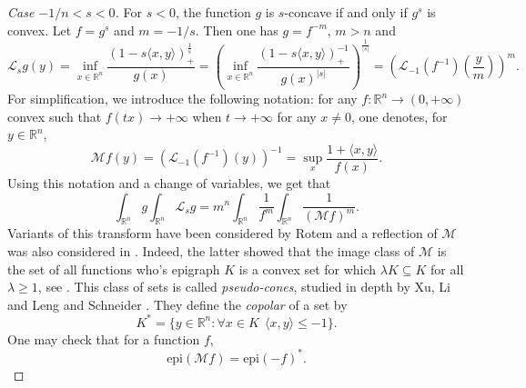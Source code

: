 \documentclass[10pt]{amsart}
\theoremstyle{definition}
\theoremstyle{remark}
\newcommand{\R}{\mathbb{R}}
\renewcommand{\L}{\mathcal{L}}
\newcommand{\M}{\mathcal{M}}
\begin{document}
\begin{proof}[Case $-1/n<s< 0$]
For $s<0$, the function $g$ is $s$-concave if and only if $g^s$ is convex. Let $f=g^s$ and $m=-1/s$. Then one has $g=f^{-m}$, $m>n$ and 
\[
\L_s g(y)=\inf_{x\in\R^n}\frac{\left(1-s\langle x,y\rangle\right)_+^\frac{1}{s}}{g(x)}
=\left(\inf_{x\in\R^n}\frac{(1-s\langle x,y\rangle)_+^{-1}}{g(x)^{|s|}}\right)^\frac{1}{|s|}
=\left(\L_{-1}(f^{-1})\left(\frac{y}{m}\right)\right)^{m}.
\]
For simplification, we introduce the following notation: for any $f:\R^n\to(0,+\infty)$ convex 
such that $f(tx)\to+\infty$ when $t\to+\infty$ for any $x\neq0$, one denotes, for $y\in\R^n$,
\[
\M f(y)=(\L_{-1}(f^{-1})(y))^{-1}=\sup_x\frac{1+\langle x,y\rangle}{f(x)}.
\]
Using this notation and a change of variables, we get that 
\begin{equation}\label{eq:Ps-when-negative}
 \int_{\R^n} g\int_{\R^n}\L_s g=m^n\int_{\R^n} \frac{1}{f^m}\int_{\R^n} \frac{1}{(\M f)^{m}}.
\end{equation}
 Variants of this transform have been considered by Rotem \cite{Rot14} and a reflection of $\M$ was also considered in \cite{AASW23}.
Indeed, the latter showed that the image class of $\M$ is the set of all functions who's epigraph $K$ is a convex set for which $\lambda K \subseteq K$ for all $\lambda \ge 1$, see \cite[Section 3]{AASW23}. This class of sets is called \emph{pseudo-cones}, studied in depth by Xu, Li and Leng \cite{XLL23} and Schneider \cite{sch23}. They define the \emph{copolar} of a set by
\[K^* = \{y\in \R^n:  \forall x \in K \ \  \langle x,y\rangle \le -1\}.\]
One may check that for a function $f$,
\[\text{epi}(\M f) = \text{epi}(-f)^*.\]



\end{proof}
\end{document}
